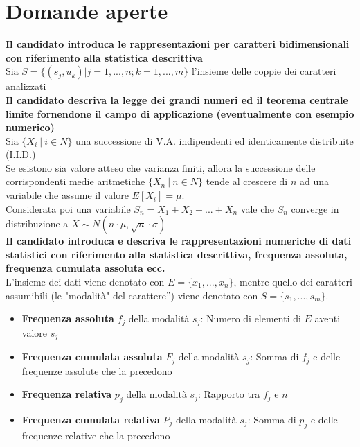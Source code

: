 \documentclass[12pt]{article}
\begin{document}
    \section{Domande aperte}
    \textbf{Il candidato introduca le rappresentazioni per caratteri bidimensionali con riferimento alla statistica descrittiva}
    \\[5pt]
    Sia $S=\{(s_j, u_k) | j = 1, ..., n; k = 1, ..., m\}$ l'insieme delle coppie dei caratteri analizzati
    \\[12pt]
    \textbf{Il candidato descriva la legge dei grandi numeri ed il teorema centrale limite fornendone il campo di applicazione (eventualmente con esempio numerico)}
    \\[5pt]
    Sia $\{X_i \ | \ i\in N\}$ una successione di V.A. indipendenti ed identicamente distribuite (I.I.D.)
    \\Se esistono sia valore atteso che varianza finiti, allora la successione delle corrispondenti medie aritmetiche $\{\overline{X}_n \ | \ n\in N\}$ tende al crescere di $n$ ad una variabile che assume il valore $E[X_i] = \mu$.
    \\Considerata poi una variabile $S_n = X_1 + X_2 + ... + X_n$ vale che $S_n$ converge in distribuzione a $X \sim N(n \cdot \mu, {\sqrt{n} \cdot \sigma })$
    \\[12pt]
    \textbf{Il candidato introduca e descriva le rappresentazioni numeriche di dati statistici con riferimento alla statistica descrittiva, frequenza assoluta, frequenza cumulata assoluta ecc.}
    \\[5pt]
    L'insieme  dei  dati  viene  denotato  con $E=\{x_1, ..., x_n\}$, mentre quello dei caratteri assumibili (le "modalità"  del  carattere”) viene denotato con $S=\{s_1, ..., s_m\}$.
    \begin{itemize}
        \item \textbf{Frequenza assoluta} $f_j$ della modalità $s_j$: Numero di elementi di $E$ aventi valore $s_j$
        \item \textbf{Frequenza cumulata assoluta} $F_j$ della modalità $s_j$: Somma di $f_j$ e delle frequenze assolute che la precedono
        \item \textbf{Frequenza relativa} $p_j$ della modalità $s_j$: Rapporto tra $f_j$ e $n$
        \item \textbf{Frequenza cumulata relativa} $P_j$ della modalità $s_j$: Somma di $p_j$ e delle frequenze relative che la precedono
    \end{itemize}
    \newpage
\end{document}
